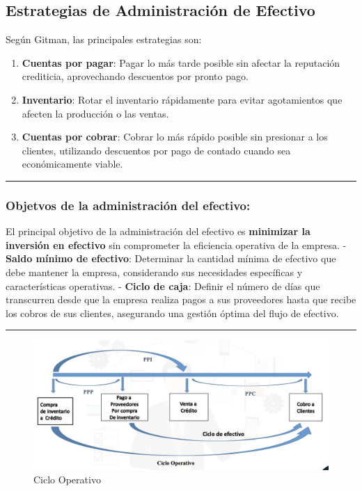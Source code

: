 \documentclass[
  letterpaper,
  DIV=11,
  numbers=noendperiod]{scrartcl}
\providecommand{\tightlist}{%
  \setlength{\itemsep}{0pt}\setlength{\parskip}{0pt}}\usepackage{longtable,booktabs,array}
\begin{document}
\subsection{Estrategias de Administración de
Efectivo}\label{estrategias-de-administraciuxf3n-de-efectivo}

Según Gitman, las principales estrategias son:

\begin{enumerate}
\def\labelenumi{\arabic{enumi}.}
\tightlist
\item
  \textbf{Cuentas por pagar}: Pagar lo más tarde posible sin afectar la
  reputación crediticia, aprovechando descuentos por pronto pago.
\item
  \textbf{Inventario}: Rotar el inventario rápidamente para evitar
  agotamientos que afecten la producción o las ventas.
\item
  \textbf{Cuentas por cobrar}: Cobrar lo más rápido posible sin
  presionar a los clientes, utilizando descuentos por pago de contado
  cuando sea económicamente viable.
\end{enumerate}

\begin{center}\rule{0.5\linewidth}{0.5pt}\end{center}

\subsubsection{Objetvos de la administración del
efectivo:}\label{objetvos-de-la-administraciuxf3n-del-efectivo}

El principal objetivo de la administración del efectivo es
\textbf{minimizar la inversión en efectivo} sin comprometer la
eficiencia operativa de la empresa. - \textbf{Saldo mínimo de efectivo}:
Determinar la cantidad mínima de efectivo que debe mantener la empresa,
considerando sus necesidades específicas y características operativas. -
\textbf{Ciclo de caja}: Definir el número de días que transcurren desde
que la empresa realiza pagos a sus proveedores hasta que recibe los
cobros de sus clientes, asegurando una gestión óptima del flujo de
efectivo.

\begin{center}\rule{0.5\linewidth}{0.5pt}\end{center}

\begin{figure}[H]

{\centering \includegraphics{Imagen1.png}

}

\caption{Ciclo Operativo}

\end{figure}%
\end{document}
